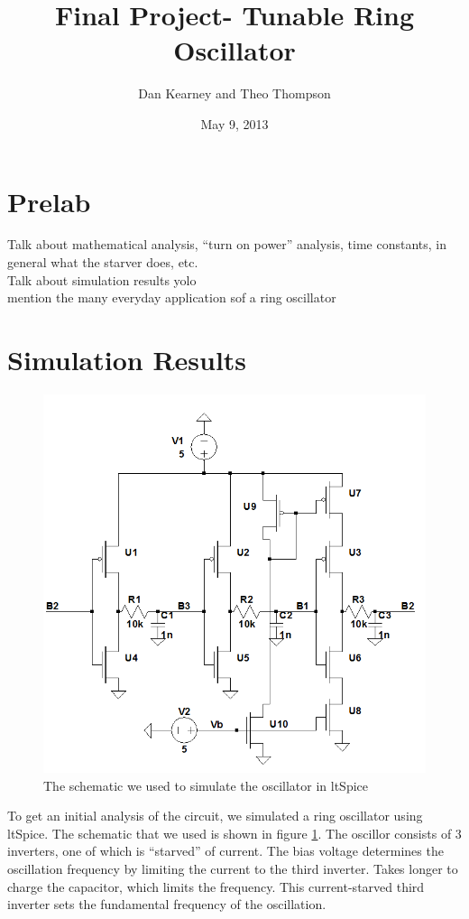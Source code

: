 \documentclass{article}
\title{Final Project- Tunable Ring Oscillator}
\author{Dan Kearney and Theo Thompson}
\date{May 9, 2013}
\begin{document}
\maketitle

\section*{Prelab}
Talk about mathematical analysis, ``turn on power'' analysis, time constants, in general what the starver does, etc.\\
Talk about simulation results yolo\\
mention the many everyday application sof a ring oscillator

\section*{Simulation Results}

\begin{figure}[H]
\centering
\includegraphics[scale=.5]{finalSchem2.png}
\caption{The schematic we used to simulate the oscillator in ltSpice}
\label{schem}
\end{figure}

To get an initial analysis of the circuit, we simulated a ring oscillator using ltSpice. The schematic that we used is shown in figure \ref{schem}. The oscillor consists of 3 inverters, one of which is ``starved'' of current. The bias voltage determines the oscillation frequency by limiting the current to the third inverter. Takes longer to charge the capacitor, which limits the frequency. This current-starved third inverter sets the fundamental frequency of the oscillation. \\
\end{document}
